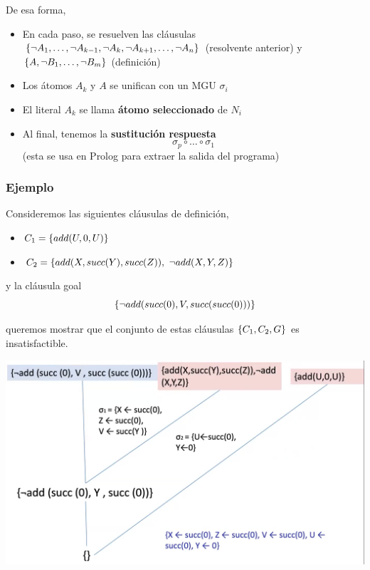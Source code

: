 \documentclass{report}
\theoremstyle{definition} %
\begin{document}
De esa forma,

\begin{itemize}
    \item En cada paso, se resuelven las cláusulas \(
        \{ 
            \neg A_1, \dots, \neg A_{k-1}, \neg A_k,
            \neg A_{k+1}, \dots, \neg A_n
         \}
    \) (resolvente anterior) y $\{ A, \neg B_1, \dots, \neg B_m \}$ (definición)

    \item Los átomos $A_k$ y $A$ se unifican con un MGU $\sigma_i$
    \item El literal $A_k$ se llama \textbf{átomo seleccionado} de $N_i$
    \item Al final, tenemos la \textbf{sustitución respuesta}
    \[
        \sigma_p \circ \dots \circ \sigma_1
    \]
    (esta se usa en Prolog para extraer la salida del programa)
\end{itemize}

\subsubsection{Ejemplo}

Consideremos las siguientes cláusulas de definición,

\begin{itemize}
    \item $C_1 = \{ add(U, 0, U) \}$
    \item $C_2 = \set{add(X, succ(Y), succ(Z)),\ \neg add(X, Y, Z)}$
\end{itemize}

y la cláusula goal
\[
    \{ \neg add(succ(0), V, succ(succ(0))) \}
\]

queremos mostrar que el conjunto de estas cláusulas $\{ C_1, C_2, G \}$ es
insatisfactible.

\begin{center}
    \includegraphics[scale=0.25]{img/resol/resol-sld-ex.png}
\end{center}
\end{document}
